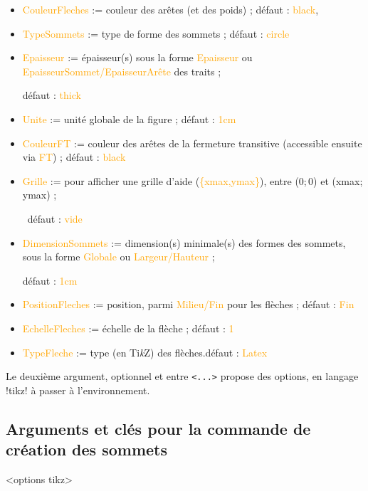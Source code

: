 \documentclass[french,a4paper,11pt]{article}
\providecommand\tikzlogo{Ti\textit{k}Z}
\let\TikZ\tikzlogo
\newcommand\Cle[1]{{\small\sffamily\textlangle \textcolor{orange}{#1}\textrangle}}
\begin{document}
{{\begin{tipblock}
\begin{itemize}
	\hfill{}défaut : \Cle{black}
	\item \Cle{CouleurFleches} := couleur des arêtes (et des poids) ; \hfill{}défaut : \Cle{black},%
	\item \Cle{TypeSommets} := type de forme des sommets ; \hfill{}défaut : \Cle{circle}
	\item \Cle{Epaisseur} := épaisseur(s) sous la forme \Cle{Epaisseur} ou \Cle{EpaisseurSommet/EpaisseurArête} des traits ;
	
	\hfill{}défaut : \Cle{thick}
	\item \Cle{Unite} := unité globale de la figure ; \hfill{}défaut : \Cle{1cm}
	\item \Cle{CouleurFT} := couleur des arêtes de la fermeture transitive (accessible ensuite via \Cle{FT}) ; \hfill{}défaut : \Cle{black}
	\item \Cle{Grille} := pour afficher une grille d'aide (\Cle{\{xmax,ymax\}}), entre (0;\,0) et (xmax;\,ymax) ;
	
	\hfill~défaut : \Cle{vide}
	\item \Cle{DimensionSommets} := dimension(s) minimale(s) des formes des sommets, sous la forme \Cle{Globale} ou \Cle{Largeur/Hauteur} ;
	
	\hfill{}défaut : \Cle{1cm}
	\item \Cle{PositionFleches} := position, parmi \Cle{Milieu/Fin} pour les flèches ; \hfill{}défaut : \Cle{Fin}
	\item \Cle{EchelleFleches} := échelle de la flèche ; \hfill{}défaut : \Cle{1}
	\item \Cle{TypeFleche} := type (en \TikZ) des flèches.\hfill{}défaut : \Cle{Latex}
\end{itemize}

Le deuxième argument, optionnel et entre \texttt{<...>} propose des options, en langage \packagetex!tikz! à passer à l'environnement.
\end{tipblock}

\pagebreak

\subsection{Arguments et clés pour la commande de création des sommets}

\begin{DemoCode}
\begin{GrapheTikz}[clés]<options tikz>
\end{GrapheTikz}
\end{DemoCode}

}}
\end{document}
